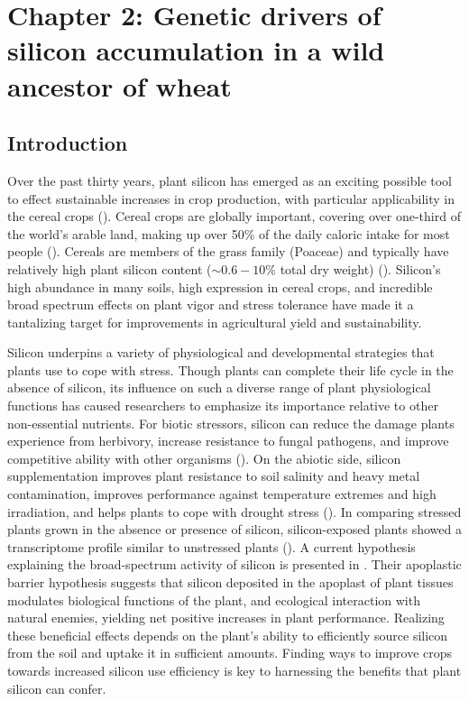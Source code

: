 \documentclass[12pt, letterpaper, ]{report}
\begin{document}
\clearpage



\chapter{Chapter 2: Genetic drivers of silicon accumulation in a wild ancestor of wheat}

\section{Introduction}

Over the past thirty years, plant silicon has emerged as an exciting possible tool to effect sustainable increases in crop production, with particular applicability in the cereal crops (\cite{reynolds_silicon_2016,christian_breeding_2022}). Cereal crops are globally important, covering over one-third of the world’s arable land, making up over 50\% of the daily caloric intake for most people (\cite{faostat, rudel_agricultural_2009, awika_major_2011}). Cereals are members of the grass family (Poaceae) and typically have relatively high plant silicon content ($\sim0.6 - 10\%$ total dry weight) (\cite{reynolds_silicon_2016}). Silicon's high abundance in many soils, high expression in cereal crops, and incredible broad spectrum effects on plant vigor and stress tolerance have made it a tantalizing target for improvements in agricultural yield and sustainability. 

Silicon underpins a variety of physiological and developmental strategies that plants use to cope with stress. Though plants can complete their life cycle in the absence of silicon, its influence on such a diverse range of plant physiological functions has caused researchers to emphasize its importance relative to other non-essential nutrients. For biotic stressors, silicon can reduce the damage plants experience from herbivory, increase resistance to fungal pathogens, and improve competitive ability with other organisms (\cite{fauteux_silicon_2005, katz_silicon_2019}). On the abiotic side, silicon supplementation improves plant resistance to soil salinity and heavy metal contamination, improves performance against temperature extremes and high irradiation, and helps plants to cope with drought stress (\cite{cooke_consistent_2016}). In comparing stressed plants grown in the absence or presence of silicon, silicon-exposed plants showed a transcriptome profile similar to unstressed plants (\cite{coskun_controversies_2019}). A current hypothesis explaining the broad-spectrum activity of silicon is presented in  \textcite{coskun_controversies_2019}. Their apoplastic barrier hypothesis suggests that silicon deposited in the apoplast of plant tissues modulates biological functions of the plant, and ecological interaction with natural enemies, yielding net positive increases in plant performance. Realizing these beneficial effects depends on the plant’s ability to efficiently source silicon from the soil and uptake it in sufficient amounts. Finding ways to improve crops towards increased silicon use efficiency is key to harnessing the benefits that plant silicon can confer. 
\end{document}
